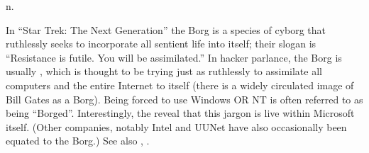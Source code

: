  n.

In ``Star Trek: The Next Generation'' the Borg is a species of cyborg that
ruthlessly seeks to incorporate all sentient life into itself; their slogan is
``Resistance is futile. You will be assimilated.'' In hacker parlance, the Borg
is usually , which is thought to be trying just as
ruthlessly to assimilate all computers and the entire Internet to itself (there
is a widely circulated image of Bill Gates as a Borg). Being forced to use
Windows OR NT is often referred to as being ``Borged''. Interestingly, the
 reveal that this jargon is live within Microsoft
itself. (Other companies, notably Intel and UUNet have also occasionally been
equated to the Borg.) See also , .

